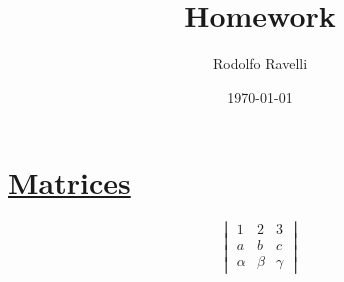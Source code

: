 \documentclass[12pt]{article}
\title{\huge Homework}
\author{Rodolfo Ravelli}
\date{\today}
\begin{document}
\maketitle
{}

\section*{\centering \underline{Matrices}}
\begin{center}
{\huge
\[
\begin{vmatrix}
 1     & 2     & 3 \\
 a     & b     & c \\
 \alpha & \beta & \gamma
\end{vmatrix}
\]
}
\end{center}
\end{document}
